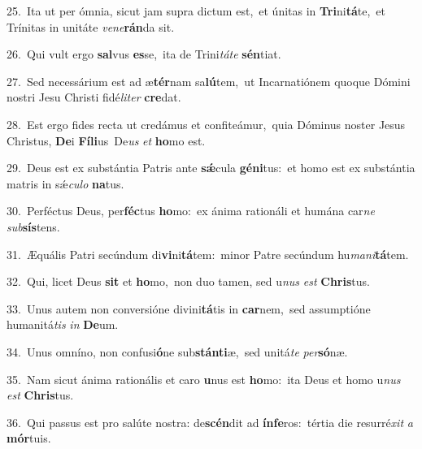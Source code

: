 {\numbfont\textcolor{\numbcolor}{25.}}~Ita ut per ómnia, sicut jam supra dictum est,~\dagger et únitas in \textbf{Tri}\-ni\-\textbf{tá}\-te,~\star et Trínitas in unitáte \textit{ve}\-\textit{ne}\textbf{rán}da sit.\par
{\numbfont\textcolor{\numbcolor}{26.}}~Qui vult ergo \textbf{sal}\-vus \textbf{es}\-se,~\star ita de Trini\-\textit{tá}\-\textit{te} \textbf{sén}\-tiat.\par
{\numbfont\textcolor{\numbcolor}{27.}}~Sed necessárium est ad æ\-\textbf{tér}\-nam sa\-\textbf{lú}\-tem,~\star ut Incarnatiónem quoque Dómini nostri Jesu Christi fidé\-\textit{li}\-\textit{ter} \textbf{cre}\-dat.\par
{\numbfont\textcolor{\numbcolor}{28.}}~Est ergo fides recta ut credámus et confiteámur,~\dagger quia Dóminus noster Jesus Christus, \textbf{De}\-i \textbf{Fí}\-\textbf{li}us~\star De\textit{us} \textit{et} \textbf{ho}\-mo est.\par
{\numbfont\textcolor{\numbcolor}{29.}}~Deus est ex substántia Patris ante \textbf{sǽ}\-cula \textbf{gé}\-\textbf{ni}tus:~\star et homo est ex substántia matris in sǽ\-\textit{cu}\-\textit{lo} \textbf{na}\-tus.\par
{\numbfont\textcolor{\numbcolor}{30.}}~Perféctus Deus, per\-\textbf{féc}\-tus \textbf{ho}\-mo:~\star ex ánima rationáli et humána car\textit{ne} \textit{sub}\-\textbf{sís}tens.\par
{\numbfont\textcolor{\numbcolor}{31.}}~Æquális Patri secúndum di\-\textbf{vi}\-ni\-\textbf{tá}\-tem:~\star minor Patre secúndum hu\-\textit{ma}\-\textit{ni}\textbf{tá}tem.\par
{\numbfont\textcolor{\numbcolor}{32.}}~Qui, licet Deus \textbf{sit} et \textbf{ho}\-mo,~\star non duo tamen, sed u\textit{nus} \textit{est} \textbf{Chris}\-tus.\par
{\numbfont\textcolor{\numbcolor}{33.}}~Unus autem non conversióne divini\-\textbf{tá}\-tis in \textbf{car}\-nem,~\star sed assumptióne humanitá\textit{tis} \textit{in} \textbf{De}\-um.\par
{\numbfont\textcolor{\numbcolor}{34.}}~Unus omníno, non confusi\-\textbf{ó}\-ne sub\-\textbf{stán}\-\textbf{ti}æ,~\star sed unitá\textit{te} \textit{per}\-\textbf{só}næ.\par
{\numbfont\textcolor{\numbcolor}{35.}}~Nam sicut ánima rationális et caro \textbf{u}\-nus est \textbf{ho}\-mo:~\star ita Deus et homo u\textit{nus} \textit{est} \textbf{Chris}\-tus.\par
{\numbfont\textcolor{\numbcolor}{36.}}~Qui passus est pro salúte nostra: de\-\textbf{scén}\-dit ad \textbf{ín}\-\textbf{fe}ros:~\star tértia die resurré\textit{xit} \textit{a} \textbf{mór}\-tuis.\par
